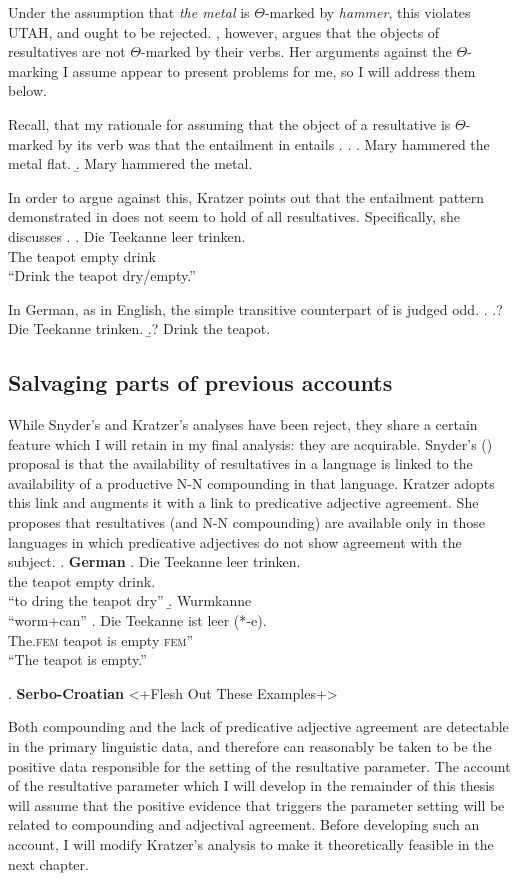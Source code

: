 \documentclass[MilwayThesis]{subfiles}
\begin{document}
Under the assumption that \textit{the metal} is $\Theta$-marked by \textit{hammer}, this violates UTAH, and ought to be rejected.
\textcite{kratzer2004building}, however, argues that the objects of resultatives are not $\Theta$-marked by their verbs.
Her arguments against the $\Theta$-marking I assume appear to present problems for me, so I will address them below.

Recall, that my rationale for assuming that the object of a resultative is $\Theta$-marked by its verb was that the entailment in \Next[a] entails \Next[b].
\ex.
\a. Mary hammered the metal flat.
\b. Mary hammered the metal.

In order to argue against this, Kratzer points out that the entailment pattern demonstrated in \Last does not seem to hold of all resultatives.
Specifically, she discusses \Next.
\exg. Die Teekanne leer trinken.\\
The teapot empty drink\\
``Drink the teapot dry/empty.''

In German, as in English, the simple transitive counterpart of \Last is judged odd.
\ex.
\a.? Die Teekanne trinken.
\b.? Drink the teapot.


\subsection{Salvaging parts of previous accounts}
While Snyder's and Kratzer's analyses have been reject, they share a certain feature which I will retain in my final analysis: they are acquirable.
Snyder's (\citeyear{snyder1995language}) proposal is that the availability of resultatives in a language is linked to the availability of a productive N-N compounding in that language.
Kratzer adopts this link and augments it with a link to predicative adjective agreement.
She proposes that resultatives (and N-N compounding) are available only in those languages in which predicative adjectives do not show agreement with the subject.
\ex. \textbf{German}
\ag. Die Teekanne leer trinken.\\
the teapot empty drink.\\
``to dring the teapot dry'' \parencite{kratzer2004building}
\b. Wurmkanne\\
``worm+can'' \parencite{snyder2001nature}
\cg. Die Teekanne ist leer (*-e).\\
The.\textsc{fem} teapot is empty \textsc{fem}''\\
``The teapot is empty.''

\ex. \textbf{Serbo-Croatian} <+Flesh Out These Examples+>

Both compounding and the lack of predicative adjective agreement are detectable in the primary linguistic data, and therefore can reasonably be taken to be the positive data responsible for the setting of the resultative parameter.
The account of the resultative parameter which I will develop in the remainder of this thesis will assume that the positive evidence that triggers the parameter setting will be related to compounding and adjectival agreement.
Before developing such an account, I will modify Kratzer's analysis to make it theoretically feasible in the next chapter.
\end{document}
